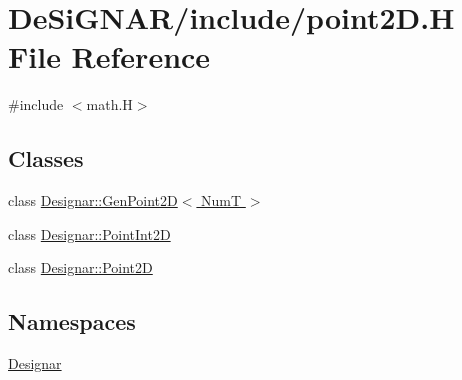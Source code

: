 \hypertarget{point2_d_8_h}{}\section{De\+Si\+G\+N\+A\+R/include/point2D.H File Reference}
\label{point2_d_8_h}
{\ttfamily \#include $<$math.\+H$>$}\newline
\subsection*{Classes}
\begin{DoxyCompactItemize}
\item 
class \hyperlink{class_designar_1_1_gen_point2_d}{Designar\+::\+Gen\+Point2\+D$<$ Num\+T $>$}
\item 
class \hyperlink{class_designar_1_1_point_int2_d}{Designar\+::\+Point\+Int2D}
\item 
class \hyperlink{class_designar_1_1_point2_d}{Designar\+::\+Point2D}
\end{DoxyCompactItemize}
\subsection*{Namespaces}
\begin{DoxyCompactItemize}
\item 
 \hyperlink{namespace_designar}{Designar}
\end{DoxyCompactItemize}
